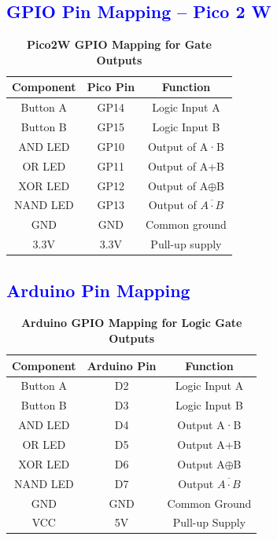 \documentclass[twocolumn]{article}
\begin{document}
\subsection*{\textcolor{blue}{GPIO Pin Mapping – Pico 2 W}}

\begin{table}[h]
\centering
\renewcommand{\arraystretch}{1.3}
\begin{tabular}{|c|c|c|}
\hline
\textbf{Component} & \textbf{Pico Pin} & \textbf{Function} \\
\hline
Button A & GP14 & Logic Input A \\
Button B & GP15 & Logic Input B \\
AND LED & GP10 & Output of A·B \\
OR LED & GP11 & Output of A+B \\
XOR LED & GP12 & Output of A$\oplus$B \\
NAND LED & GP13 & Output of $\overline{A\cdot B}$ \\
GND & GND & Common ground \\
3.3V & 3.3V & Pull-up supply \\
\hline
\end{tabular}
\caption*{\textbf{Pico2W GPIO Mapping for Gate Outputs}}
\end{table}

\subsection*{\textcolor{blue}{Arduino Pin Mapping}}

\begin{table}[h]
\centering
\renewcommand{\arraystretch}{1.3}
\begin{tabular}{|c|c|c|}
\hline
\textbf{Component} & \textbf{Arduino Pin} & \textbf{Function} \\
\hline
Button A & D2 & Logic Input A \\
Button B & D3 & Logic Input B \\
AND LED & D4 & Output A·B \\
OR LED & D5 & Output A+B \\
XOR LED & D6 & Output A$\oplus$B \\
NAND LED & D7 & Output $\overline{A\cdot B}$ \\
GND & GND & Common Ground \\
VCC & 5V & Pull-up Supply \\
\hline
\end{tabular}
\caption*{\textbf{Arduino GPIO Mapping for Logic Gate Outputs}}
\end{table}
\end{document}
